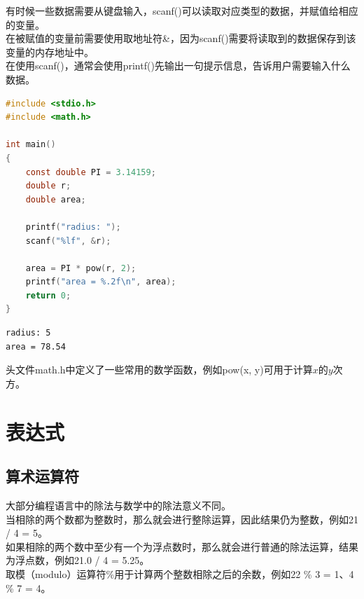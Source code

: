 有时候一些数据需要从键盘输入，scanf()可以读取对应类型的数据，并赋值给相应的变量。\\

在被赋值的变量前需要使用取地址符\&，因为scanf()需要将读取到的数据保存到该变量的内存地址中。\\

在使用scanf()，通常会使用printf()先输出一句提示信息，告诉用户需要输入什么数据。\\


\begin{lstlisting}[language=C]
#include <stdio.h>
#include <math.h>

int main()
{
	const double PI = 3.14159;
	double r;
	double area;

	printf("radius: ");
	scanf("%lf", &r);

	area = PI * pow(r, 2);
	printf("area = %.2f\n", area);
	return 0;
}
\end{lstlisting}

\begin{tcolorbox}
	\begin{verbatim}
radius: 5
area = 78.54
	\end{verbatim}
\end{tcolorbox}

头文件math.h中定义了一些常用的数学函数，例如pow(x, y)可用于计算$ x $的$ y $次方。\\

\newpage

\section{表达式}

\subsection{算术运算符}

大部分编程语言中的除法与数学中的除法意义不同。\\

当相除的两个数都为整数时，那么就会进行整除运算，因此结果仍为整数，例如21 / 4 = 5。\\

如果相除的两个数中至少有一个为浮点数时，那么就会进行普通的除法运算，结果为浮点数，例如21.0 / 4 = 5.25。\\

取模（modulo）运算符\%用于计算两个整数相除之后的余数，例如22 \% 3 = 1、4 \% 7 = 4。\\

